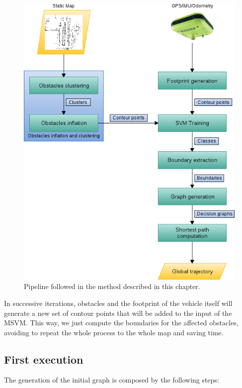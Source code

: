 \begin{figure}[h!]
      \centering
      \includegraphics[width=\textwidth]{pipeline}
      \caption{ Pipeline followed in the method described in this chapter. }      
      \label{fig:cp06_pipeline}
\end{figure}

In successive iterations, obstacles and the footprint of the vehicle itself will generate a new set of contour points that will be added to the input of the \ac{MSVM}. This way, we just compute the boundaries for the affected obstacles, avoiding to repeat the whole process to the whole map and saving time.

\subsection{First execution}\label{ch:chapter06_01_01}

The generation of the initial graph is composed by the following steps:

